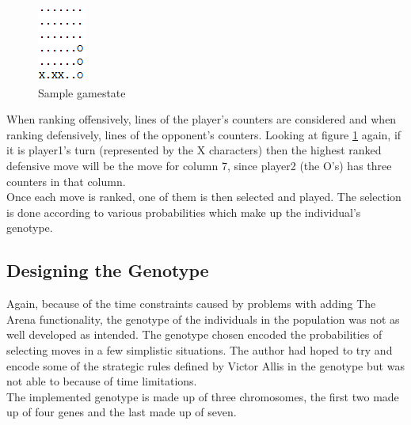 \begin{figure}[h]
   \begin{center}
     \includegraphics{Figures/gamestate}
   \end{center}
   \caption{Sample gamestate}
   \label{fig:gamestate}
\end{figure} 
When ranking offensively, lines of the player's counters are considered and when ranking defensively, lines of the opponent's counters. Looking at figure \ref{fig:gamestate} again, if it is player1's turn (represented by the X characters) then the highest ranked defensive move will be the move for column 7, since player2 (the O's) has three counters in that column.
\\Once each move is ranked, one of them is then selected and played. The selection is done according to various probabilities which make up the individual's genotype.

\subsection{Designing the Genotype}
Again, because of the time constraints caused by problems with adding The Arena functionality, the genotype of the individuals in the population was not as well developed as intended. The genotype chosen encoded the probabilities of selecting moves in a few simplistic situations. The author had hoped to try and encode some of the strategic rules defined by Victor Allis\cite{connect4} in the genotype but was not able to because of time limitations. 
\\The implemented genotype is made up of three chromosomes, the first two made up of four genes and the last made up of seven.

